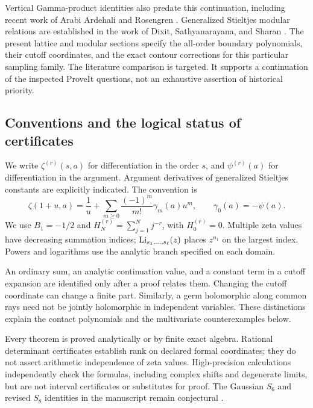 Vertical Gamma-product identities also predate this continuation,
including recent work of Arabi Ardehali and Rosengren
\cite{ArdehaliRosengren}. Generalized Stieltjes modular relations
are established in the work of Dixit, Sathyanarayana, and Sharan
\cite{DixitStieltjes}. The present lattice and modular sections
specify the all-order boundary polynomials, their cutoff
coordinates, and the exact contour corrections for this particular
sampling family. The literature comparison is targeted. It
supports a continuation of the inspected ProveIt questions, not
an exhaustive assertion of historical priority.

\subsection{Conventions and the logical status of certificates}

We write \(\zeta^{(r)}(s,a)\) for differentiation in the order
\(s\), and \(\psi^{(r)}(a)\) for differentiation in the argument.
Argument derivatives of generalized Stieltjes constants are
explicitly indicated. The convention is
\[
 \zeta(1+u,a)=\frac1u+
       \sum_{m\ge0}\frac{(-1)^m}{m!}\gamma_m(a)u^m,
 \qquad \gamma_0(a)=-\psi(a).
\]
We use \(B_1=-1/2\) and
\(H_N^{(r)}=\sum_{j=1}^N j^{-r}\), with \(H_0^{(r)}=0\).
Multiple zeta values have decreasing summation indices;
\(\operatorname{Li}_{s_1,\ldots,s_\ell}(z)\) places \(z^{n_1}\) on the
largest index. Powers and logarithms use the analytic branch
specified on each domain.

An ordinary sum, an analytic continuation value, and a constant
term in a cutoff expansion are identified only after a proof
relates them. Changing the cutoff coordinate can change a
finite part. Similarly, a germ holomorphic along common rays
need not be jointly holomorphic in independent variables.
These distinctions explain the contact polynomials and the
multivariate counterexamples below.

Every theorem is proved analytically or by finite exact algebra.
Rational determinant certificates establish rank on declared
formal coordinates; they do not assert arithmetic independence
of zeta values. High-precision calculations independently check
the formulas, including complex shifts and degenerate limits,
but are not interval certificates or substitutes for proof.
The Gaussian \(S_6\) and revised \(S_8\) identities in the
manuscript remain conjectural \cite{RepoManuscript}.

